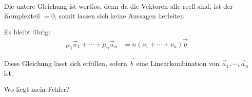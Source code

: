 \documentclass[a4paper,german,12pt,smallheadings]{scrartcl}
\begin{document}
Die untere Gleichung ist wertlos, denn da die Vektoren alle reell sind, ist der
Komplexteil $= 0$, somit lassen sich keine Aussagen herleiten.

Es bleibt übrig:
\begin{align*}
  \mu_1\vec{a}_{1} + \dotsb + \mu_n\vec{a}_{n} &= n(\nu_1 + \dotsb + \nu_n)\vec{b}
\end{align*}

Diese Gleichung lässt sich erfüllen, sofern $\vec{b}$ eine Linearkombination
von $\vec{a}_1, \dotsb, \vec{a}_n$ ist.

Wo liegt mein Fehler?
\end{document}

